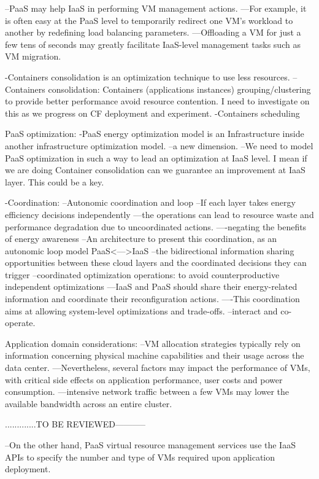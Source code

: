 --PaaS may help IaaS in performing VM management actions.
---For example, it is often easy at the PaaS level to temporarily redirect one VM’s workload to another by redefining load balancing parameters.
---Offloading a VM for just a few tens of seconds may greatly facilitate IaaS-level management tasks such as VM migration.

-Containers consolidation is an optimization technique to use less resources.
--Containers consolidation: Containers (applications instances) grouping/clustering to provide better performance avoid resource contention. I need to investigate on this as we progress on CF deployment and experiment.
-Containers scheduling

PaaS optimization:
-PaaS energy optimization model is an Infrastructure inside another infrastructure optimization model. 
--a new dimension.
--We need to model PaaS optimization in such a way to lead an optimization at IaaS level. I mean if we are doing Container consolidation can we guarantee an improvement at IaaS layer. This could be a key.

-Coordination:
--Autonomic coordination and loop
--If each layer takes energy efficiency decisions independently
---the operations can lead to resource waste and performance degradation due to uncoordinated actions.
----negating the benefits of energy awareness
--An architecture to present this coordination, as an autonomic loop model PaaS<--->IaaS
--the bidirectional information sharing opportunities between these cloud layers and the coordinated decisions they can trigger
--coordinated optimization operations: to avoid counterproductive independent optimizations
---IaaS and PaaS should share their energy-related information and coordinate their reconfiguration actions. 
----This coordination aims at allowing system-level optimizations and trade-offs.
--interact and co-operate.

Application domain considerations:
--VM allocation strategies typically rely on information concerning physical machine capabilities and their usage across the data center. 
---Nevertheless, several factors may impact the performance of VMs, with critical side effects on application performance, user costs and power consumption.
---intensive network traffic between a few VMs may lower the available bandwidth across an entire cluster. 

.............TO BE REVIEWED-----------

--On the other hand, PaaS virtual resource management services use the IaaS APIs to specify the number and type of VMs required upon application deployment.

